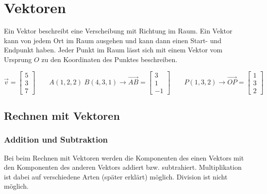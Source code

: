 \section{Vektoren}

Ein Vektor beschreibt eine Verscheibung mit Richtung im Raum.
Ein Vektor kann von jedem Ort im Raum ausgehen und kann dann einen Start- und Endpunkt haben.
Jeder Punkt im Raum lässt sich mit einem Vektor vom Ursprung $O$ zu den
Koordinaten des Punktes beschreiben.

\begin{equation*}
    \vec{v} = \begin{bmatrix}
        5 \\
        3 \\
        7
    \end{bmatrix}
    \qquad A (1, 2, 2) \; B (4, 3, 1) \rightarrow \vec{AB} = \begin{bmatrix}
        3 \\
        1 \\
        -1
    \end{bmatrix}
    \qquad P (1, 3, 2) \rightarrow \vec{OP} = \begin{bmatrix}
        1 \\
        3 \\
        2
    \end{bmatrix}
\end{equation*}

\subsection{Rechnen mit Vektoren}

\subsubsection{Addition und Subtraktion}

Bei beim Rechnen mit Vektoren werden die Komponenten des einen Vektors
mit den Komponenten des anderen Vektors addiert bzw. subtrahiert.
Multiplikation ist dabei auf verschiedene Arten (später erklärt) möglich.
Division ist nicht möglich.


